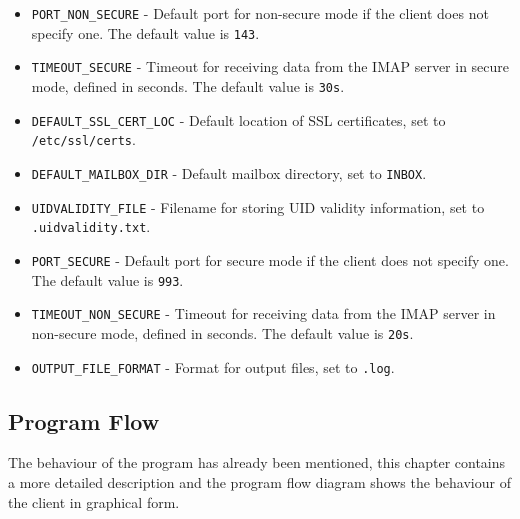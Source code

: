 \documentclass[a4paper,11pt]{article}
\begin{document}
\begin{itemize}
    \item \texttt{PORT\_NON\_SECURE} - Default port for non-secure mode if the client does not specify one. The default value is \texttt{143}.
    
    \item \texttt{TIMEOUT\_SECURE} - Timeout for receiving data from the IMAP server in secure mode, defined in seconds. The default value is \texttt{30s}.
    
    \item \texttt{DEFAULT\_SSL\_CERT\_LOC} - Default location of SSL certificates, set to \texttt{/etc/ssl/certs}.
    
    \item \texttt{DEFAULT\_MAILBOX\_DIR} - Default mailbox directory, set to \texttt{INBOX}.
    
    \item \texttt{UIDVALIDITY\_FILE} - Filename for storing UID validity information, set to \texttt{.uidvalidity.txt}.
    
    \item \texttt{PORT\_SECURE} - Default port for secure mode if the client does not specify one. The default value is \texttt{993}.
    
    \item \texttt{TIMEOUT\_NON\_SECURE} - Timeout for receiving data from the IMAP server in non-secure mode, defined in seconds. The default value is \texttt{20s}.
    
    \item \texttt{OUTPUT\_FILE\_FORMAT} - Format for output files, set to \texttt{.log}.
\end{itemize}

\subsection{Program Flow}
The behaviour of the program has already been mentioned, this chapter contains a more detailed 
description and the program flow diagram shows the behaviour of the client in graphical form.
\end{document}
